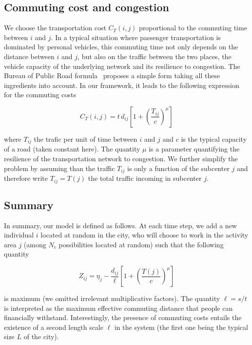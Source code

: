 \subsection{Commuting cost and congestion}
\label{sub:the_commuting_cost}


We choose the transportation cost $C_T(i,j)$ proportional to the commuting time
between $i$ and $j$. In a typical situation where passenger transportation is
dominated by personal vehicles, this commuting time not only depends on the
distance between $i$ and $j$, but also on the traffic between the two places,
the vehicle capacity of the underlying network and its resilience to congestion.
The Bureau of Public Road formula~\cite{Branston:1976} proposes a simple form
taking all these ingredients into account. In our framework, it leads to the
following expression for the commuting costs

\begin{equation}
    C_T(i,j) =  t\, d_{ij} \left[ 1 + \left( \frac{T_{ij}}{c} \right)^{\mu} \right]
    \label{eq:commuting_cost}
\end{equation}

where $T_{ij}$ the trafic per unit of time between $i$ and $j$ and $c$
is the typical capacity of a road (taken constant here). The quantity
$\mu$ is a parameter quantifying the resilience of the transportation
network to congestion. We further simplify the problem by assuming
than the traffic $T_{ij}$ is only a function of the subcenter $j$ and
therefore write $T_{ij}=T(j)$ the total traffic incoming in subcenter
$j$.

\subsection{Summary}
\label{sub:summary}


In summary, our model is defined as follows. At each time step, we add
a new individual $i$ located at random in the city, who will
choose to work in the activity area $j$ (among $N_c$ possibilities
located at random) such that the following quantity

\begin{equation}
    Z_{ij} = \eta_j - \frac{d_{ij}}{\ell} \left[ 1 + \left( \frac{T(j)}{c} \right)^{\mu} \right]
    \label{eq:cost_function}
\end{equation}

is maximum (we omitted irrelevant multiplicative factors). The quantity $\ell =
s/t$ is interpreted as the maximum effective commuting distance that people can
financially withstand. Interestingly, the presence of commuting costs entails the
existence of a second length scale $\ell$ in the system (the first one being the
typical size $L$ of the city).

